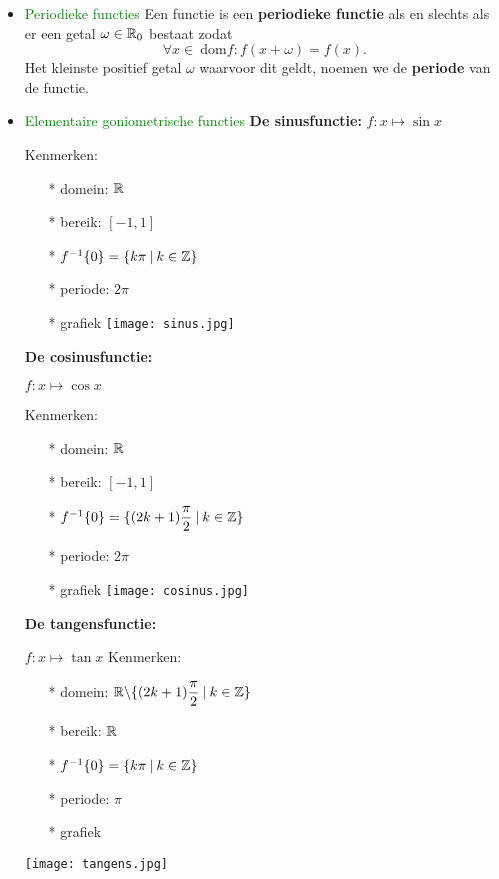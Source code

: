 \begin{itemize}
\item \textcolor{green}{\hypertarget{periodieke_functies}{Periodieke functies}}\label{periodieke_functies}\newline
Een functie is een {\bf periodieke functie} als en slechts als er een getal $\omega \in \mathbb{R}_0$ bestaat zodat \[\forall x \in \:\mbox{dom}f : f(x+\omega)=f(x).\] Het 		kleinste positief getal $\omega$ waarvoor dit geldt, noemen we de {\bf periode} van 		de functie.
\item \textcolor{green}{Elementaire goniometrische functies}\newline\newline
\hypertarget{sinusfunctie}{{\bf De sinusfunctie: }}\label{sinusfunctie}$f :x\mapsto\sin x$\vskip 0.5cm

Kenmerken: \begin{itemize}
		\item[*] domein: $\mathbb{R}$
		\item[*] bereik: $[-1, 1]$
		\item[*] $f^{-1}\{0\}=\{k\pi\:|\:k\in\mathbb{Z}\}$
		\item[*] periode: $2\pi$
		\item[*] grafiek %
                         \texttt{[image: sinus.jpg]}
		\end{itemize}
\hypertarget{cosinusfunctie}{{\bf De cosinusfunctie: }}\label{cosinusfunctie}$f :x\mapsto\cos x$\vskip 0.5cm

Kenmerken: \begin{itemize}
		\item[*] domein: $\mathbb{R}$
		\item[*] bereik: $[-1, 1]$
		\item[*] $f^{-1}\{0\}=\{(2k+1)\displaystyle\frac{\displaystyle \pi}{\displaystyle 2}\:|\:k\in\mathbb{Z}\}$
		\item[*] periode: $2\pi$
		\item[*] grafiek %
                         \texttt{[image: cosinus.jpg]}
		\end{itemize}
\hypertarget{tangensfunctie}{{\bf De tangensfunctie: }}\label{tangensfunctie}$f :x\mapsto\tan{x}$\vskip 		0.5cm
Kenmerken:\begin{itemize}
		\item[*] domein: $\mathbb{R} \backslash \{(2k+1)\displaystyle\frac{\displaystyle \pi}{\displaystyle 2}\:|\:k\in\mathbb{Z}\}$
		\item[*] bereik: $\mathbb{R}$
		\item[*] $f^{-1}\{0\}=\{k\pi\:|\:k\in\mathbb{Z}\}$
		\item[*] periode: $\pi$
		\item[*] grafiek 
		\end{itemize}
                \texttt{[image: tangens.jpg]}


\end{itemize}
